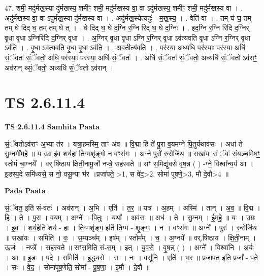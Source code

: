 \documentclass[17pt]{extarticle}
\begin{document}
47. शमी॒ मदु॑र्मख॒स्या दु॑र्मखस्य॒ शमीꣳ॒॒ शमी॒ मदु॑र्मखस्य वा॒ वा ऽदु॑र्मखस्य॒ शमीꣳ॒॒ शमी॒ मदु॑र्मखस्य वा । . अदु॑र्मखस्य वा॒ वा ऽदु॑र्मख॒स्या दु॑र्मखस्य वा । . अदु॑र्मख॒स्येत्यदुः॑ - म॒ख॒स्य॒ । . वेति॑ वा । . तम् घ॑ घ॒ तम् तम् घे दिद् घ॒ तम् तम् घे त् । . घे दिद् घ॒ घे द॒ग्नि र॒ग्नि रिद् घ॒ घे द॒ग्निः । . इद॒ग्नि र॒ग्नि रिदि द॒ग्निर् वृ॒धा वृ॒धा ऽग्निरिदि द॒ग्निर् वृ॒धा । . अ॒ग्निर् वृ॒धा वृ॒धा ऽग्नि र॒ग्निर् वृ॒धा ऽव॑त्यवति वृ॒धा ऽग्नि र॒ग्निर् वृ॒धा ऽव॑ति । . वृ॒धा ऽव॑त्यवति वृ॒धा वृ॒धा ऽव॑ति । . अ॒व॒तीत्य॑वति । . पर॑स्या॒ अध्यधि॒ पर॑स्याः॒ पर॑स्या॒ अधि॑ सं॒ॅवतः॑ सं॒ॅवतो॒ अधि॒ पर॑स्याः॒ पर॑स्या॒ अधि॑ सं॒ॅवतः॑ । . अधि॑ सं॒ॅवतः॑ सं॒ॅवतो॒ अध्यधि॑ सं॒ॅवतो ऽव॑राꣳ॒॒ अव॑रान् थ्सं॒ॅवतो॒ अध्यधि॑ सं॒ॅवतो ऽव॑रान् । \newline
\pagebreak
{}
\section*{ TS 2.6.11.4 }

\textbf{TS 2.6.11.4 } \newline
\textbf{Samhita Paata} \newline

सं॒ॅवतोऽव॑राꣳ अ॒भ्या त॑र । यत्रा॒हमस्मि॒ ताꣳ अ॑व ॥ वि॒द्मा हि ते॑ पु॒रा व॒यमग्ने॑ पि॒तुर्यथाव॑सः । अधा॑ ते सु॒म्नमी॑महे ॥ य उ॒ग्र इ॑व शर्य॒हा ति॒ग्मशृ॑ङ्गो॒ न वꣳस॑गः । अग्ने॒ पुरो॑ रु॒रोजि॑थ ॥ सखा॑यः॒ सं ॅवः॑ सं॒यञ्च॒मिषꣳ॒॒ स्तोमं॑ चा॒ग्नये᳚ । वर्.षि॑ष्ठाय क्षिती॒नामू॒र्जो नप्त्रे॒ सह॑स्वते ॥ सꣳ स॒मिद्यु॑वसे वृष॒न्न ( ) -ग्ने॒ विश्वा᳚न्य॒र्य आ । इ॒डस्प॒दे समि॑ध्यसे॒ स नो॒ वसू॒न्या भ॑र ।प्रजा॑पते॒ >1, स वे॑द॒>2, सोमा॑ पूषणे॒>3, मौ दे॒वौ>4 ॥ \newline

\textbf{Pada Paata} \newline

सं॒ॅवत॒ इति॑ सं-वतः॑ । अव॑रान् । अ॒भि । एति॑ । त॒र॒ ॥ यत्र॑ । अ॒हम् । अस्मि॑ । तान् । अ॒व॒ ॥ वि॒द्म । हि । ते॒ । पु॒रा । व॒यम् । अग्ने᳚ । पि॒तुः । यथा᳚ । अव॑सः ॥ अध॑ । ते॒ । सु॒म्नम् । ई॒म॒हे॒ ॥ यः । उ॒ग्रः । इ॒व॒ । श॒र्य॒हेति॑ शर्य - हा । ति॒ग्मशृ॑ङ्ग॒ इति॑ ति॒ग्म - शृ॒ङ्गः॒ । न । वꣳस॑गः ॥ अग्ने᳚ । पुरः॑ । रु॒रोजि॑थ ॥ सखा॑यः । समिति॑ । वः॒ । स॒म्यञ्च᳚म् । इष᳚म् । स्तोम᳚म् । च॒ । अ॒ग्नये᳚ ॥ वर्.षि॑ष्ठाय । क्षि॒ती॒नाम् । ऊ॒र्जः । नप्त्रे᳚ । सह॑स्वते ॥ सꣳस॒मिति॒ सं-स॒म् । इत् । यु॒व॒से॒ । वृ॒ष॒न्न् ( ) । अग्ने᳚ । विश्वा॑नि । अ॒र्यः । आ ॥ इ॒डः । प॒दे । समिति॑ । इ॒द्ध्य॒से॒ । सः । नः॒ । वसू॑नि । एति॑ । भ॒र॒ ॥ प्रजा॑पत॒ इति॒ प्रजा᳚ - प॒ते॒ । सः । वे॒द॒ । सोमा॑पूष॒णेति॒ सोमा᳚ - पू॒ष॒णा॒ । इ॒मौ । दे॒वौ ॥  \newline
\end{document}

